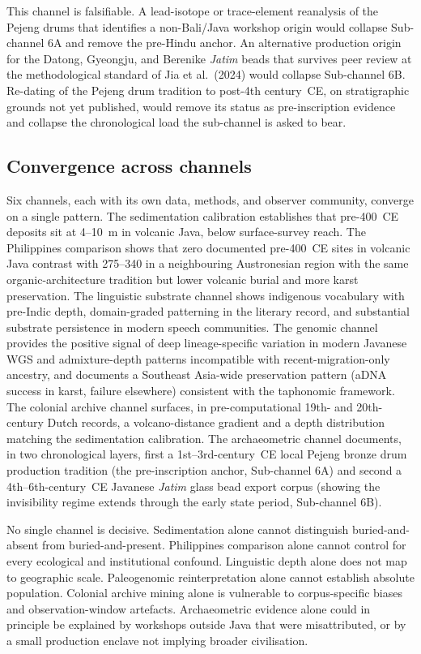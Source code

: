 \documentclass[12pt,a4paper]{article}
\begin{document}
This channel is falsifiable. A lead-isotope or trace-element reanalysis of the Pejeng drums that identifies a non-Bali/Java workshop origin would collapse Sub-channel 6A and remove the pre-Hindu anchor. An alternative production origin for the Datong, Gyeongju, and Berenike \textit{Jatim} beads that survives peer review at the methodological standard of Jia et al.\ (2024) would collapse Sub-channel 6B. Re-dating of the Pejeng drum tradition to post-4th century~CE, on stratigraphic grounds not yet published, would remove its status as pre-inscription evidence and collapse the chronological load the sub-channel is asked to bear.


\subsection{Convergence across channels}
\label{sec:convergence}

Six channels, each with its own data, methods, and observer community, converge on a single pattern. The sedimentation calibration establishes that pre-400~CE deposits sit at 4--10~m in volcanic Java, below surface-survey reach. The Philippines comparison shows that zero documented pre-400~CE sites in volcanic Java contrast with 275--340 in a neighbouring Austronesian region with the same organic-architecture tradition but lower volcanic burial and more karst preservation. The linguistic substrate channel shows indigenous vocabulary with pre-Indic depth, domain-graded patterning in the literary record, and substantial substrate persistence in modern speech communities. The genomic channel provides the positive signal of deep lineage-specific variation in modern Javanese WGS and admixture-depth patterns incompatible with recent-migration-only ancestry, and documents a Southeast Asia-wide preservation pattern (aDNA success in karst, failure elsewhere) consistent with the taphonomic framework. The colonial archive channel surfaces, in pre-computational 19th- and 20th-century Dutch records, a volcano-distance gradient and a depth distribution matching the sedimentation calibration. The archaeometric channel documents, in two chronological layers, first a 1st--3rd-century~CE local Pejeng bronze drum production tradition (the pre-inscription anchor, Sub-channel 6A) and second a 4th--6th-century~CE Javanese \textit{Jatim} glass bead export corpus (showing the invisibility regime extends through the early state period, Sub-channel 6B).

No single channel is decisive. Sedimentation alone cannot distinguish buried-and-absent from buried-and-present. Philippines comparison alone cannot control for every ecological and institutional confound. Linguistic depth alone does not map to geographic scale. Paleogenomic reinterpretation alone cannot establish absolute population. Colonial archive mining alone is vulnerable to corpus-specific biases and observation-window artefacts. Archaeometric evidence alone could in principle be explained by workshops outside Java that were misattributed, or by a small production enclave not implying broader civilisation.
\end{document}
